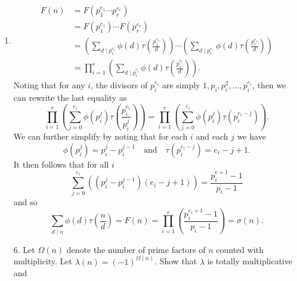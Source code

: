 \documentclass[12pt]{article}
\makeatletter
\theoremstyle{definition}
\theoremstyle{remark}
\renewenvironment{proof}[1][\proofname]{\par
  \pushQED{\qed}%
  \normalfont \topsep6\p@\@plus6\p@\relax
  \list{}{\leftmargin=0mm
          \rightmargin=4mm
          \settowidth{\itemindent}{\itshape#1}%
          \labelwidth=\itemindent
          \parsep=0pt \listparindent=\parindent 
  }
  \item[\hskip\labelsep
        \itshape
    #1\@addpunct{.}]\ignorespaces
}{%
  \popQED\endlist\@endpefalse
}
\let\oldproofname=\proofname
\renewcommand{\proofname}{\bf{\textit{\oldproofname}}}
\makeatother
\begin{document}
\begin{enumerate}[leftmargin=*]
\begin{proof}
\begin{equation*}
                        \begin{split}
                            F(n)&=F(p_1^{e_1}\cdots p_r^{e_r}) \\
                            &= F(p_1^{e_1})\cdots F(p_r^{e_r}) \\
                            &= \left(\sum_{d\mid p_1^{e_1}}\phi(d)\tau\left(\frac{p_1^{e_1}}{d}\right)\right)\cdots\left(\sum_{d\mid p_r^{e_r}}\phi(d)\tau\left(\frac{p_r^{e_r}}{d}\right)\right) \\
                            &=\prod_{i=1}^r\left(\sum_{d\mid p_i^{e_i}}\phi(d)\tau\left(\frac{p_i^{e_i}}{d}\right)\right).
                        \end{split}
                    \end{equation*}
                Noting that for any $i$, the divisors of $p_i^{e_i}$ are simply $1,p_i,p_i^2,\dots,p_i^{e_i}$, then we can rewrite the last equality as
                    \begin{equation*}
                        \prod_{i=1}^r\left(\sum_{j=0}^{e_i}\phi(p_i^j)\tau\left(\frac{p_i^{e_i}}{p_i^j}\right)\right)=\prod_{i=1}^r\left(\sum_{j=0}^{e_i}\phi(p_i^j)\tau(p_i^{e_i-j})\right).
                    \end{equation*}
                We can further simplify by noting that for each $i$ and each $j$ we have
                    \begin{equation*}
                        \phi(p_i^j)=p_i^j-p_i^{j-1}\quad\text{and}\quad\tau(p_i^{e_i-j})=e_i-j+1.
                    \end{equation*}
                It then follows that for all $i$
                    \begin{equation*}
                        \sum_{j=0}^{e_i}\left((p_i^j-p_i^{j-1})(e_i-j+1)\right)=\frac{p_i^{e+1}-1}{p_i-1}
                    \end{equation*}
                and so
                    \begin{equation*}
                        \sum_{d\mid n}\phi(d)\tau(\frac{n}{d})=F(n)=\prod_{i=1}^r\left(\frac{p_i^{e_i+1}-1}{p_i-1}\right)=\sigma(n).
                    \end{equation*}
            \end{proof}
        \item[6.] Let $\Omega(n)$ denote the number of prime factors of $n$ counted with multiplicity. Let $\lambda(n)=(-1)^{\Omega(n)}$. Show that $\lambda$ is totally multiplicative and 
            \begin{equation*}

\end{equation*}
\end{enumerate}
\end{document}
